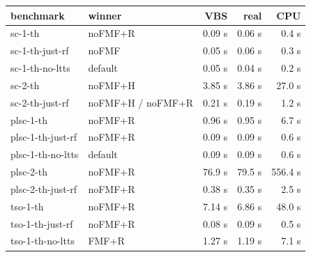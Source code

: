 \begin{tabular}{@{}llrrr@{}}
\toprule
benchmark & winner & VBS & real & CPU \\
\midrule
sc-1-th & noFMF+R & 0.09 s & 0.06 s & 0.4 s \\
sc-1-th-just-rf & noFMF & 0.05 s & 0.06 s & 0.3 s \\
sc-1-th-no-ltts & default & 0.05 s & 0.04 s & 0.2 s \\
sc-2-th & noFMF+H & 3.85 s & 3.86 s & 27.0 s \\
sc-2-th-just-rf & noFMF+H / noFMF+R & 0.21 s & 0.19 s & 1.2 s \\
plsc-1-th & noFMF+R & 0.96 s & 0.95 s & 6.7 s \\
plsc-1-th-just-rf & noFMF+R & 0.09 s & 0.09 s & 0.6 s \\
plsc-1-th-no-ltts & default & 0.09 s & 0.09 s & 0.6 s \\
plsc-2-th & noFMF+R & 76.9 s & 79.5 s & 556.4 s \\
plsc-2-th-just-rf & noFMF+R & 0.38 s & 0.35 s & 2.5 s \\
tso-1-th & noFMF+R & 7.14 s & 6.86 s & 48.0 s \\
tso-1-th-just-rf & noFMF+R & 0.08 s & 0.09 s & 0.5 s \\
tso-1-th-no-ltts & FMF+R & 1.27 s & 1.19 s & 7.1 s \\
\bottomrule
\end{tabular}
